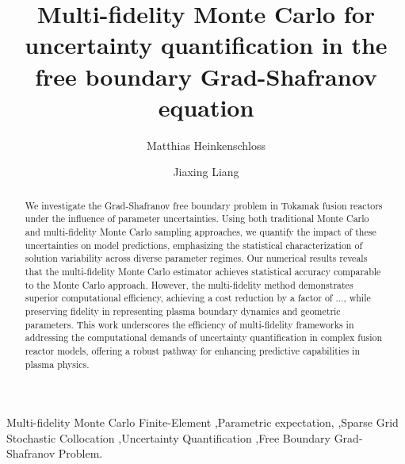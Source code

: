 \documentclass[final,3p,times,11pt]{elsarticle}
\begin{document}
\begin{frontmatter}
\title{Multi-fidelity Monte Carlo for uncertainty quantification in the free boundary Grad-Shafranov equation}


\author[umdcs]{Matthias Heinkenschloss}
\address[umdcs]{Department of Computational Applied Mathematics \& Operations Research, Rice University.}
\author[umdm]{Jiaxing Liang}
\address[umdm]{Department of Computational Applied Mathematics \& Operations Research, Rice University.}
\begin{abstract}
We investigate the Grad-Shafranov free boundary problem in Tokamak fusion reactors under the influence of parameter uncertainties. Using both traditional Monte Carlo and multi-fidelity Monte Carlo sampling approaches, we quantify the impact of these uncertainties on model predictions, emphasizing the statistical characterization of solution variability across diverse parameter regimes. Our numerical results reveals that the multi-fidelity Monte Carlo estimator achieves statistical accuracy comparable to the Monte Carlo approach. However, the multi-fidelity method demonstrates superior computational efficiency, achieving a cost reduction by a factor of ..., while preserving fidelity in representing plasma boundary dynamics and geometric parameters. This work underscores the efficiency of multi-fidelity frameworks in addressing the computational demands of uncertainty quantification in complex fusion reactor models, offering a robust pathway for enhancing predictive capabilities in plasma physics. 
\end{abstract}

\begin{keyword}
Multi-fidelity Monte Carlo Finite-Element \sep Parametric expectation, \sep Sparse Grid Stochastic Collocation \sep Uncertainty Quantification \sep Free Boundary Grad-Shafranov Problem.
%
\MSC[2020] 
\end{keyword}
\end{frontmatter}

 
 








% 


\end{document}
